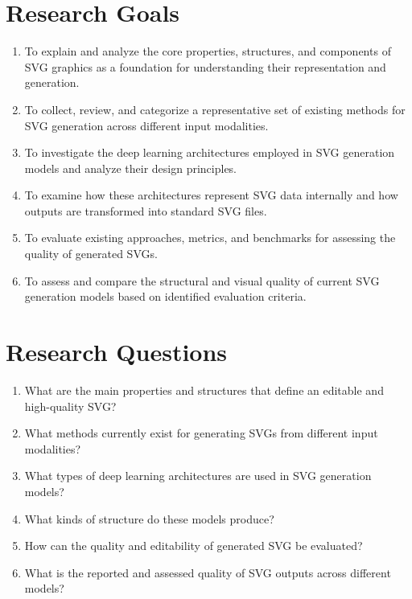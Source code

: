 \section{Research Goals}

\begin{enumerate}
    \item To explain and analyze the core properties, 
    structures, and components of SVG graphics as a 
    foundation for understanding their representation 
    and generation.
    \item To collect, review, and categorize a 
    representative set of existing methods for SVG 
    generation across different input modalities.
    \item To investigate the deep learning architectures 
    employed in SVG generation models and analyze their 
    design principles.
    \item To examine how these architectures represent 
    SVG data internally and how outputs are transformed 
    into standard SVG files.
    \item To evaluate existing approaches, metrics, and 
    benchmarks for assessing the quality of generated 
    SVGs.
    \item To assess and compare the structural and visual 
    quality of current SVG generation models based on 
    identified evaluation criteria.
\end{enumerate}


\section{Research Questions}

\begin{enumerate}
    \item What are the main properties and structures 
    that define an editable and high-quality SVG?
    \item What methods currently exist for 
    generating SVGs from different input modalities?
    \item What types of deep learning architectures are 
    used in SVG generation models?
    \item What kinds of structure do these models produce?
    \item How can the quality and editability of generated 
    SVG be evaluated?
    \item What is the reported and assessed quality of 
    SVG outputs across different models?
\end{enumerate}


